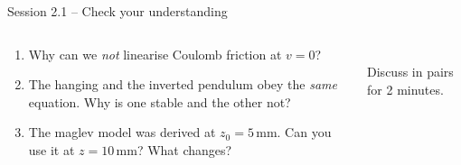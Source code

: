 \documentclass[aspectratio=169,10pt]{beamer}
\begin{document}
\begin{frame}{Session 2.1 -- Check your understanding}
\begin{columns}[T]
\begin{keybox}
\begin{enumerate}
  \item Why can we \emph{not} linearise Coulomb friction at $v=0$?
  \item The hanging and the inverted pendulum obey the \emph{same} equation. Why is one stable and the other not?
  \item The maglev model was derived at $z_0=5$\,mm. Can you use it at $z=10$\,mm? What changes?
\end{enumerate}
\end{keybox}
\centering
{}\\[2mm]
\footnotesize Discuss in pairs for 2 minutes.
\end{columns}
\end{frame}
\end{document}
